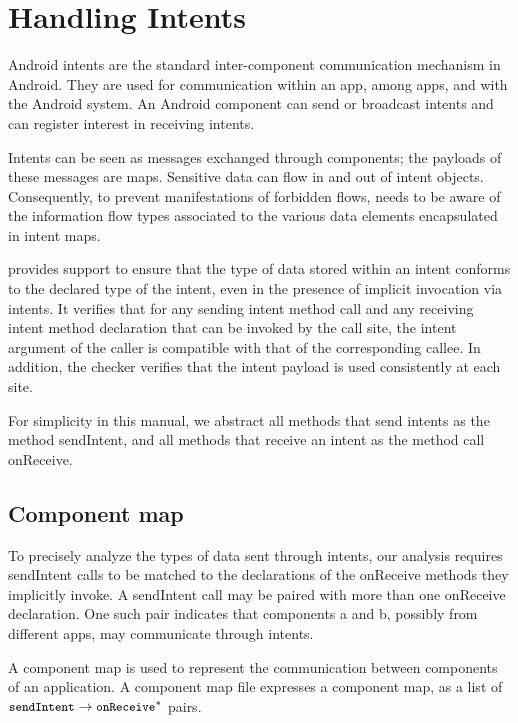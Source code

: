 \htmlhr

\newcommand{\tp}[1]{\mathit{typeof}}
\newcommand{\Fix}[1]{\textbf{[[}{\color{red} #1}\textbf{]]}}


\chapter{Handling Intents\label{intent-checker}}

Android intents are the standard inter-component communication
mechanism in Android.  They are used for communication within an app,
among apps, and with the Android system.  An Android component can
send or broadcast intents and can register interest in receiving
intents.

Intents can be seen as messages exchanged through components; the
payloads of these messages are maps.  Sensitive data can flow in and
out of intent objects.  Consequently, to prevent manifestations of
forbidden flows, \theFlowChecker{} needs to be aware of the
information flow types associated to the various data elements
encapsulated in intent maps.

\TheFlowChecker{} provides support to
ensure that the type of data stored within an intent conforms to the
declared type of the intent, even in the presence of implicit
invocation via intents.  It verifies that for any sending intent
method call and any receiving intent method declaration that can be
invoked by the call site, the intent argument of the caller is
compatible with that of the corresponding callee.  In addition, the
checker verifies that the intent payload is used consistently at each
site.

For simplicity in this manual, we abstract all methods that send intents as the
method sendIntent, and all methods that receive an intent as the method call
onReceive.

\section{Component map}
To precisely analyze the types of data sent through intents, our analysis
requires sendIntent calls to be matched to the declarations of the onReceive
methods they implicitly invoke. A sendIntent call may be paired
with more than one onReceive declaration. One such pair indicates that 
components a and b, possibly from different apps, may communicate through 
intents. 

A component map is used to represent the communication between components of an
application. A component map file expresses a 
component map, as a list of $\flow{\|sendIntent|}{\|onReceive|^*}$ pairs.

